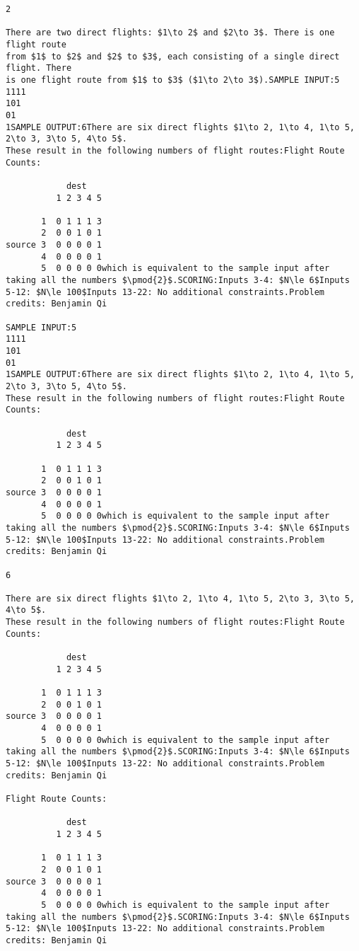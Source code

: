 \documentclass[12pt]{article}
\begin{document}
\begin{verbatim}
2

There are two direct flights: $1\to 2$ and $2\to 3$. There is one flight route
from $1$ to $2$ and $2$ to $3$, each consisting of a single direct flight. There
is one flight route from $1$ to $3$ ($1\to 2\to 3$).SAMPLE INPUT:5
1111
101
01
1SAMPLE OUTPUT:6There are six direct flights $1\to 2, 1\to 4, 1\to 5, 2\to 3, 3\to 5, 4\to 5$.
These result in the following numbers of flight routes:Flight Route Counts:

            dest
          1 2 3 4 5

       1  0 1 1 1 3 
       2  0 0 1 0 1 
source 3  0 0 0 0 1 
       4  0 0 0 0 1 
       5  0 0 0 0 0which is equivalent to the sample input after taking all the numbers $\pmod{2}$.SCORING:Inputs 3-4: $N\le 6$Inputs 5-12: $N\le 100$Inputs 13-22: No additional constraints.Problem credits: Benjamin Qi

SAMPLE INPUT:5
1111
101
01
1SAMPLE OUTPUT:6There are six direct flights $1\to 2, 1\to 4, 1\to 5, 2\to 3, 3\to 5, 4\to 5$.
These result in the following numbers of flight routes:Flight Route Counts:

            dest
          1 2 3 4 5

       1  0 1 1 1 3 
       2  0 0 1 0 1 
source 3  0 0 0 0 1 
       4  0 0 0 0 1 
       5  0 0 0 0 0which is equivalent to the sample input after taking all the numbers $\pmod{2}$.SCORING:Inputs 3-4: $N\le 6$Inputs 5-12: $N\le 100$Inputs 13-22: No additional constraints.Problem credits: Benjamin Qi

6

There are six direct flights $1\to 2, 1\to 4, 1\to 5, 2\to 3, 3\to 5, 4\to 5$.
These result in the following numbers of flight routes:Flight Route Counts:

            dest
          1 2 3 4 5

       1  0 1 1 1 3 
       2  0 0 1 0 1 
source 3  0 0 0 0 1 
       4  0 0 0 0 1 
       5  0 0 0 0 0which is equivalent to the sample input after taking all the numbers $\pmod{2}$.SCORING:Inputs 3-4: $N\le 6$Inputs 5-12: $N\le 100$Inputs 13-22: No additional constraints.Problem credits: Benjamin Qi

Flight Route Counts:

            dest
          1 2 3 4 5

       1  0 1 1 1 3 
       2  0 0 1 0 1 
source 3  0 0 0 0 1 
       4  0 0 0 0 1 
       5  0 0 0 0 0which is equivalent to the sample input after taking all the numbers $\pmod{2}$.SCORING:Inputs 3-4: $N\le 6$Inputs 5-12: $N\le 100$Inputs 13-22: No additional constraints.Problem credits: Benjamin Qi


\end{verbatim}
\end{document}
